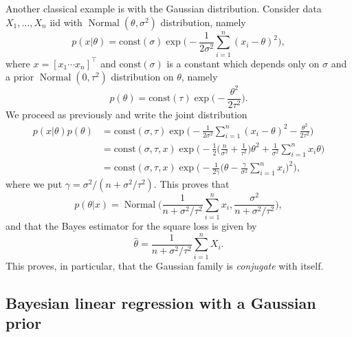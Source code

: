 \documentclass[
	fontsize=11pt, %
	twoside=false, %
	numbers=noenddot, %
]{kaobook}
\DeclareMathOperator{\nor}{Normal}
\newcommand{\wh}{\widehat}
\begin{document}
Another classical example is with the Gaussian distribution.
Consider data $X_1, \ldots, X_n$ iid with $\nor(\theta, \sigma^2)$ distribution, namely
\begin{equation*}
	p(x | \theta) = \text{const}(\sigma) \exp\Big( - \frac{1}{2 \sigma^2} \sum_{i=1}^n 
	(x_i - \theta)^2 \Big),
\end{equation*}
where $x = [x_1 \cdots x_n]^\top$ and $\text{const}(\sigma)$ is a constant which depends only on $\sigma$ and a prior $\nor(0, \tau^2)$ distribution on $\theta$, namely
\begin{equation*}
	p(\theta) = \text{const}(\tau) \exp\Big(-\frac{\theta^2}{2 \tau^2} \Big).
\end{equation*}
We proceed as previously and write the joint distribution
\begin{align*}
	p(x | \theta) p(\theta) &= \text{const}(\sigma, \tau) \exp\Big( - \frac{1}{2 \sigma^2} 
	\sum_{i=1}^n (x_i - \theta)^2 - \frac{\theta^2}{2 \tau^2} \Big) \\
	&= \text{const}(\sigma, \tau, x) \exp \bigg ( - \frac 12 \Big( \frac{n}{\sigma^2} + \frac{1}{\tau^2} \Big) \theta^2 + \frac{1}{\sigma^2} \sum_{i=1}^n x_i \theta  \bigg) \\
	&= \text{const}(\sigma, \tau, x) \exp \bigg( - \frac{1}{2 \gamma} \Big(\theta - \frac{\gamma}{\sigma^2} \sum_{i=1}^n x_i \Big)^2 \bigg),
\end{align*}
where we put $\gamma = \sigma^2 / (n + \sigma^2 / \tau^2)$.
This proves that
\begin{equation*}
	p(\theta | x) = \nor \bigg( \frac{1}{n + \sigma^2 / \tau^2} \sum_{i=1}^n x_i, \frac{\sigma^2}{n + \sigma^2 / \tau^2} \bigg),
\end{equation*}
and that the Bayes estimator for the square loss is given by
\begin{equation*}
	\wh \theta = \frac{1}{n + \sigma^2 / \tau^2} \sum_{i=1}^n X_i.
\end{equation*}
This proves, in particular, that the Gaussian family is \emph{conjugate} with itself.


\subsection{Bayesian linear regression with a Gaussian prior} %
\label{sub:bayesian-linear-regression}
\end{document}
